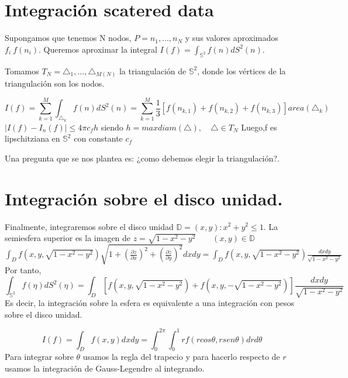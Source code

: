 \section{Integración scatered data}
Supongamos que tenemos N nodos, $P={n_1,...,n_N}$ y sus valores aproximados $f_i~f(n_i)$. Queremos aproximar la integral $I(f) =  \int_{\mathds{S}^2} f(n)dS^2(n)$.

\medskip
Tomamos $T_N={\triangle_1,...,\triangle_{M(N)}}$ la triangulación de $\mathds{S}^2$, donde los vértices de la triangulación son los nodos.

$$
I(f) = \sum_{k=1}^{M} \int_{\triangle_k} f(n)dS^2(n) =  \sum_{k=1}^{M} \frac{1}{3}[f(n_{k,1})+f(n_{k,2})+f(n_{k,3})] area(\triangle_k)
$$
$|I(f)-I_n(f)|\le 4\pi c_f h$ siendo $h=max diam(\triangle), \quad \triangle\in T_N$
Luego,f es lipschitziana en $\mathds{S}^2$ con constante $ c_f$

Una pregunta que se nos plantea es: ¿como debemos elegir la triangulación?.
\section{Integración sobre el disco unidad.}
Finalmente, integraremos sobre el disco unidad $\mathds{D}={(x,y):x^2+y^2 \le 1}.$
La semiesfera superior es la imagen de 
$z=\sqrt{1-x^2-y^2} \qquad (x,y)\in \mathds{D}$
$\int_{D}f(x,y,\sqrt{1-x^2-y^2})\sqrt{1+(\frac{\partial z}{\partial x})^2+(\frac{\partial z}{\partial y})^2} dx dy = \int_D f(x,y,\sqrt{1-x^2-y^2})\frac{dx dy}{\sqrt{1-x^2-y^2}}$
Por tanto,
$$ \int_{\mathds{S}^2}f(\eta) dS^2(\eta) = \int_D \left[f(x,y,\sqrt{1-x^2-y^2})+f(x,y,-\sqrt{1-x^2-y^2})\right]\frac{dx dy}{\sqrt{1-x^2-y^2}} $$
Es decir, la integración sobre la esfera es equivalente a una integración con pesos sobre el disco unidad.


$$I(f)=\int_{D} f(x,y) dxdy = \int_{0}^{2\pi}\int_{0}^{1} rf(rcos\theta,rsen\theta)drd\theta $$
Para integrar sobre $\theta$ usamos la regla del trapecio y para hacerlo respecto de $r$ usamos la integración de Gauss-Legendre al integrando.

